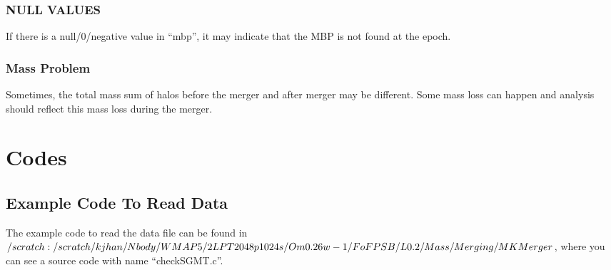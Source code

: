 \documentclass[openleft]{memoir}
\begin{document}
\subsection{NULL VALUES}
If there is a null/0/negative value in ``mbp'', it may indicate that the MBP is not found at the epoch.

\subsection{Mass Problem}
Sometimes, the total mass sum of halos before the merger and after merger may be different.
Some mass loss can happen and analysis should reflect this mass loss during the merger.
\subsection{}



\chapter{Codes}
\section{Example Code To Read Data}
The example code to read the data file can be found
in \\
$\//scratch:
\//scratch\//kjhan\//Nbody\//WMAP5\//2LPT2048p1024s\//Om0.26w-1\\ 
\//FoFPSB\//
L0.2\//Mass\//Merging\//MKMerger$,
\noindent where you can see a source code with name ``checkSGMT.c''.
\end{document}
